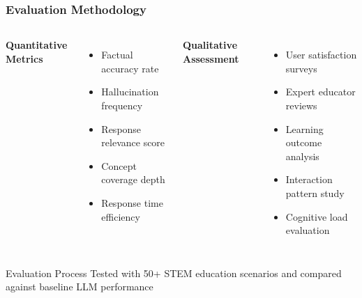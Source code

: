 \documentclass{beamer}
\begin{document}
\begin{frame}
\frametitle{Evaluation Methodology}

\begin{columns}

\textbf{Quantitative Metrics} \cite{chen2024comparing}
\begin{itemize}
    \item Factual accuracy rate
    \item Hallucination frequency
    \item Response relevance score
    \item Concept coverage depth
    \item Response time efficiency
\end{itemize}

\textbf{Qualitative Assessment} \cite{wilson2024educational}
\begin{itemize}
    \item User satisfaction surveys
    \item Expert educator reviews
    \item Learning outcome analysis
    \item Interaction pattern study
    \item Cognitive load evaluation
\end{itemize}

\end{columns}

\begin{block}{Evaluation Process}
Tested with 50+ STEM education scenarios and compared against baseline LLM performance
\end{block}
\end{frame}
\end{document}
